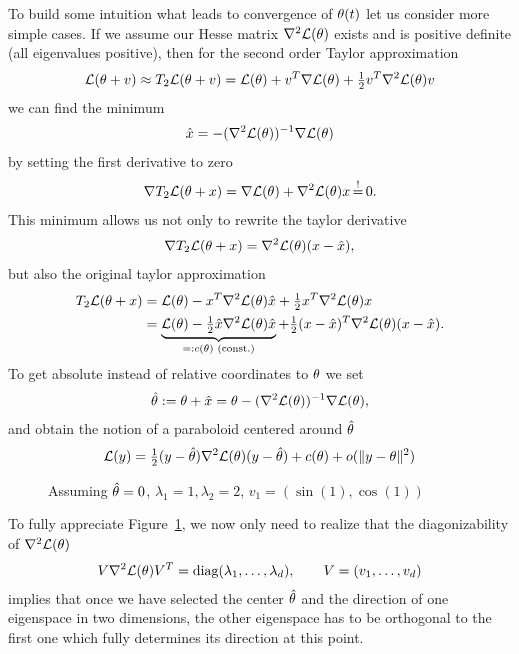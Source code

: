 To build some intuition what leads to convergence of \(\theta(t)\) let us
consider more simple cases. If we assume our Hesse matrix \(\nabla^2
\mathcal{L}(\theta)\) exists and is positive definite (all eigenvalues positive), then for
the second order Taylor approximation
%
\begin{align*}
	\mathcal{L}(\theta+v) \approx T_2\mathcal{L}(\theta+v)
	= \mathcal{L}(\theta) + v^T \nabla \mathcal{L}(\theta) + \tfrac12 v^T \nabla^2 \mathcal{L}(\theta) v
\end{align*}
%
we can find the minimum 
\begin{align*}
	\hat{x} = -(\nabla^2 \mathcal{L}(\theta))^{-1}\nabla \mathcal{L}(\theta)
\end{align*}
by setting the first derivative to zero
%
\begin{align*}
	\nabla T_2\Loss(\weights+x) = \nabla \Loss(\weights) + \nabla^2\Loss(\weights) x \xeq{!} 0.
\end{align*}
%
This minimum allows us not only to rewrite the taylor derivative
%
\begin{align*}
	\nabla T_2\mathcal{L}(\theta+x) = \nabla^2 \mathcal{L}(\theta)(x-\hat{x}),
\end{align*}
%
but also the original taylor approximation
%
\begin{align*}
	T_2\mathcal{L}(\theta+x)
	&= \mathcal{L}(\theta) - x^T \nabla^2 \mathcal{L}(\theta) \hat{x} + \tfrac12 x^T \nabla^2 \mathcal{L}(\theta) x \\
	&= \underbrace{
		\mathcal{L}(\theta) - \tfrac12 \hat{x} \nabla^2 \mathcal{L}(\theta) \hat{x}
	}_{
		=: c(\theta) \text{ (const.)}
	} + \tfrac12 (x-\hat{x})^T \nabla^2 \mathcal{L}(\theta)(x-\hat{x}).
\end{align*}
%
To get absolute instead of relative coordinates to \(\theta\) we set
%
\begin{align*}
	\hat{\theta} := \theta + \hat{x} = \theta -(\nabla^2 \mathcal{L}(\theta))^{-1}\nabla \mathcal{L}(\theta),
\end{align*}
%
and obtain the notion of a paraboloid centered around \(\hat{\theta}\)
%
\begin{align}\label{paraboloid approximation of L}
	\mathcal{L}(y)
	= \tfrac12 (y- \hat{\theta}) \nabla^2 \mathcal{L}(\theta) (y-\hat{\theta})
	+ c(\theta) + o(\|y-\theta\|^2)
\end{align}
%
\begin{wrapfigure}{O}{0.65\textwidth}
	\centering
	\def\svgwidth{0.65\textwidth}
	
	\caption{Assuming \(\hat{\theta}=0\), \(\lambda_1=1, \lambda_2=2\), \(v_1=(\sin(1), \cos(1))\)}
	\label{fig: 2d paraboloid}
\end{wrapfigure}
%
To fully appreciate Figure~\ref{fig: 2d paraboloid}, we now only need to realize
that the diagonizability of \(\nabla^2 \mathcal{L}(\theta)\)
%
\begin{align}\label{eq: diagnalization of the Hesse matrix}
	V \nabla^2 \mathcal{L}(\theta) V^T
	= \text{diag}(\lambda_1,\dots,\lambda_d), \qquad V=(v_1,\dots, v_d)
\end{align}
%
implies that once we have selected the center \(\hat{\theta}\) and the direction of
one eigenspace in two dimensions, the other eigenspace has to be
orthogonal to the first one which fully determines its direction at this point. 

